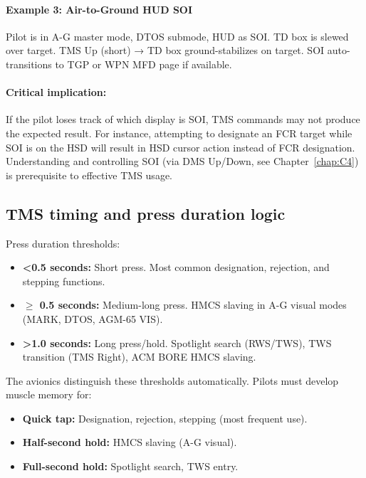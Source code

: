 \documentclass[11pt, a4paper, twoside]{report}
\begin{document}
\paragraph{Example 3: Air-to-Ground HUD SOI}
Pilot is in A-G master mode, DTOS submode, HUD as SOI. TD box is slewed over target. TMS Up (short) → TD box ground-stabilizes on target. SOI auto-transitions to TGP or WPN MFD page if available.

\paragraph{Critical implication:}
If the pilot loses track of which display is SOI, TMS commands may not produce the expected result. For instance, attempting to designate an FCR target while SOI is on the HSD will result in HSD cursor action instead of FCR designation. Understanding and controlling SOI (via DMS Up/Down, see Chapter~\ref{chap:C4}) is prerequisite to effective TMS usage.

\subsection{TMS timing and press duration logic}
\label{sec:C3-S1-S4}

Press duration thresholds:
\begin{itemize}
    \item \textbf{<0.5 seconds:} Short press. Most common designation, rejection, and stepping functions.
    \item \textbf{$\geq$ 0.5 seconds:} Medium-long press. HMCS slaving in A-G visual modes (MARK, DTOS, AGM-65 VIS).
    \item \textbf{>1.0 seconds:} Long press/hold. Spotlight search (RWS/TWS), TWS transition (TMS Right), ACM BORE HMCS slaving.
\end{itemize}

The avionics distinguish these thresholds automatically. Pilots must develop muscle memory for:
\begin{itemize}
    \item \textbf{Quick tap:} Designation, rejection, stepping (most frequent use).
    \item \textbf{Half-second hold:} HMCS slaving (A-G visual).
    \item \textbf{Full-second hold:} Spotlight search, TWS entry.
\end{itemize}
\end{document}
